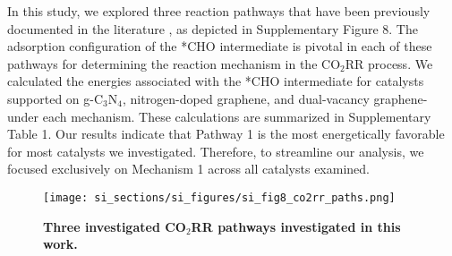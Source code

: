 In this study, we explored three reaction pathways that have been previously documented in the literature \cite{durand2011structure, nie2014reaction, peterson2010copper}, as depicted in Supplementary Figure 8.
The adsorption configuration of the *CHO intermediate is pivotal in each of these pathways for determining the reaction mechanism in the CO$_2$RR process.
We calculated the energies associated with the *CHO intermediate for catalysts
supported on g-C$_3$N$_4$, nitrogen-doped graphene, and dual-vacancy graphene-under each mechanism.
These calculations are summarized in Supplementary Table 1.
Our results indicate that Pathway 1 is the most energetically favorable for most catalysts we investigated.
Therefore, to streamline our analysis, we focused exclusively on Mechanism 1 across all catalysts examined.


\begin{figure}
  \centering
  \texttt{[image: si\_sections/si\_figures/si\_fig8\_co2rr\_paths.png]}
  \caption{\textbf{Three investigated CO$_2$RR pathways \cite{durand2011structure, nie2014reaction, peterson2010copper} investigated in this work.}}
  \label{si_fig8:co2rr_paths}
\end{figure}


